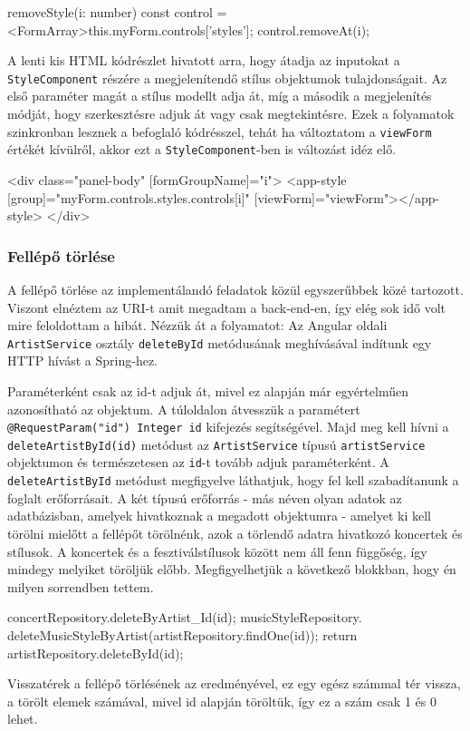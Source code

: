 \begin{java}
 removeStyle(i: number) {
    const control = <FormArray>this.myForm.controls['styles'];
    control.removeAt(i);
  }
\end{java}
A lenti kis HTML kódrészlet hivatott arra, hogy átadja az inputokat a \texttt{StyleComponent} részére a megjelenítendő stílus objektumok tulajdonságait. Az első paraméter magát a stílus modellt adja át, míg a második a megjelenítés módját, hogy szerkesztésre adjuk át vagy csak megtekintésre. Ezek a folyamatok szinkronban lesznek a befoglaló kódrésszel, tehát ha változtatom a \texttt{viewForm} értékét kívülről, akkor ezt a \texttt{StyleComponent}-ben is változást idéz elő.
\begin{java}
<div class="panel-body" [formGroupName]="i">
     <app-style [group]="myForm.controls.styles.controls[i]"
     [viewForm]="viewForm"></app-style>
</div>
\end{java}

\subsubsection{Fellépő törlése}
A fellépő törlése az implementálandó feladatok közül egyszerűbbek közé tartozott. Viszont elnéztem az URI-t amit megadtam a back-end-en, így elég sok idő volt mire feloldottam a hibát. Nézzük át a folyamatot: Az Angular oldali \texttt{ArtistService} osztály \texttt{deleteById} metódusának meghívásával indítunk egy HTTP hívást a Spring-hez.


Paraméterként csak az id-t adjuk át, mivel ez alapján már egyértelműen azonosítható az objektum. A túloldalon átvesszük a paramétert \texttt{@RequestParam("id") Integer id} kifejezés segítségével.
Majd meg kell hívni a \texttt{deleteArtistById(id)} metódust az \texttt{ArtistService} típusú \texttt{artistService} objektumon és természetesen az \texttt{id}-t tovább adjuk paraméterként. A \texttt{deleteArtistById} metódust megfigyelve láthatjuk, hogy fel kell szabadítanunk a foglalt erőforrásait. A két típusú erőforrás - más néven olyan adatok az adatbázisban, amelyek hivatkoznak a megadott objektumra - amelyet ki kell törölni mielőtt a fellépőt törölnénk, azok a törlendő adatra hivatkozó koncertek és stílusok. A koncertek és a fesztiválstílusok között nem áll fenn függőség, így mindegy melyiket töröljük előbb. Megfigyelhetjük a következő blokkban, hogy én milyen sorrendben tettem.
\begin{java}
concertRepository.deleteByArtist_Id(id);
musicStyleRepository.
deleteMusicStyleByArtist(artistRepository.findOne(id));
return artistRepository.deleteById(id);
\end{java}
Visszatérek a fellépő törlésének az eredményével, ez egy egész számmal tér vissza, a törölt elemek számával, mivel id alapján töröltük, így ez a szám csak 1 és 0 lehet.

